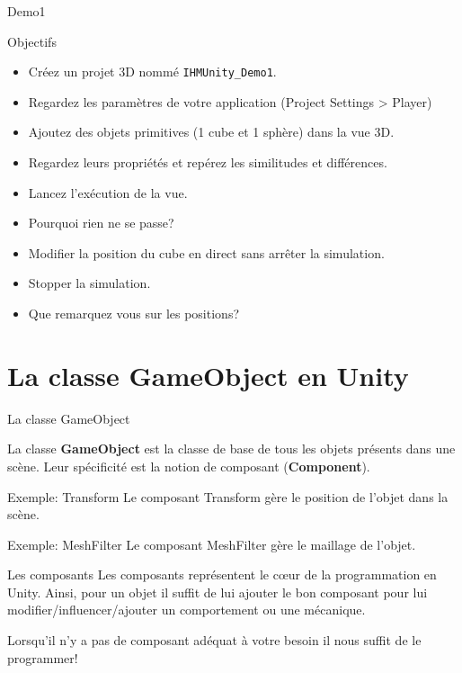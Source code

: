 \begin{frame}{Demo1}
	\vfill
	\begin{block}{Objectifs}
	\begin{itemize}
		\item Créez un projet 3D nommé \texttt{IHMUnity\_Demo1}.
		\item Regardez les paramètres de votre application (Project Settings > Player)
		\item Ajoutez des objets primitives (1 cube et 1 sphère) dans la vue 3D.
		\item Regardez leurs propriétés et repérez les similitudes et différences.
		\item Lancez l'exécution de la vue.
		\item Pourquoi rien ne se passe?
		\item Modifier la position du cube en direct sans arrêter la simulation.
		\item Stopper la simulation.
		\item Que remarquez vous sur les positions?
	\end{itemize}
	\end{block}
	\vfill
\end{frame}

\section{La classe GameObject en Unity}

\begin{frame}{La classe GameObject}
	
	\begin{definition}
		La classe \textbf{GameObject} est la classe de base de tous les objets présents dans une scène. Leur spécificité est la notion de composant (\textbf{Component}).
	\end{definition}

	\begin{exampleblock}{Exemple: Transform}
		Le composant Transform gère le position de l'objet dans la scène.
	\end{exampleblock}

	\begin{exampleblock}{Exemple: MeshFilter}
	Le composant MeshFilter gère le maillage de l'objet.
\end{exampleblock}

\begin{alertblock}{Les composants}
	Les composants représentent le c\oe ur de la programmation en Unity. Ainsi, pour un objet il suffit de lui ajouter le bon composant pour lui modifier/influencer/ajouter un comportement ou une mécanique.
	
	Lorsqu'il n'y a pas de composant adéquat à votre besoin il nous suffit de le \alert{programmer}!
\end{alertblock}
	
\end{frame}

